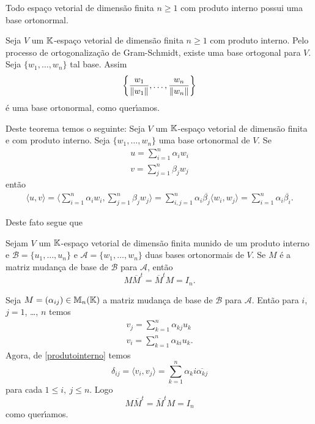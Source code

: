 \begin{teorema}
	Todo espa\c{c}o vetorial de dimens\~ao finita $n \ge 1$ com produto interno possui uma base ortonormal.
\end{teorema}
\begin{prova}
	Seja $V$ um $\mathbb{K}$-espa\c{c}o vetorial de dimens\~ao finita $n \ge 1$ com produto interno. Pelo processo de ortogonaliza\c{c}\~ao de Gram-Schmidt, existe uma base ortogonal para $V$. Seja $\{w_1, \dots, w_n\}$ tal base. Assim
	\[
		\left\{\dfrac{w_1}{\left\lVert w_1\right\rVert}, \dots, \dfrac{w_n}{\left\lVert w_n\right\rVert}\right\}
	\]
	\'e uma base ortonormal, como quer{\'\i}amos.
\end{prova}

Deste teorema temos o seguinte: Seja $V$ um $\mathbb{K}$-espa\c{c}o vetorial de dimens\~ao finita e com produto interno. Seja $\{w_1, \dots, w_n\}$ uma base ortonormal de $V$. Se
\begin{align*}
	u = \sum_{i = 1}^n \alpha_i w_i\\
	v = \sum_{j = 1}^n \beta_j w_j
\end{align*}
ent\~ao
\begin{align}\label{produtointerno}
	\langle u, v \rangle = \langle \sum_{i = 1}^n \alpha_i w_i, \sum_{j = 1}^n \beta_j w_j \rangle = \sum_{i, j = 1}^n \alpha_i \overline{\beta_j} \langle w_i, w_j \rangle = \sum_{i = 1}^n \alpha_i \overline{\beta_i}.
\end{align}

Deste fato segue que
\begin{corolario}
	Sejam $V$ um $\mathbb{K}$-espa\c{c}o vetorial de dimens\~ao finita munido de um produto interno e $\mathcal{B} = \{u_1, \dots, u_n\}$ e $\mathcal{A} = \{w_1, \dots, w_n\}$ duas bases ortonormais de $V$. Se $M$ \'e a matriz mudan\c{c}a de base de $\mathcal{B}$ para $\mathcal{A}$, ent\~ao
	\[
		M\overline{M}^t = \overline{M}^tM = I_n.
	\]
\end{corolario}
\begin{prova}
	Seja $M = (\alpha_{ij}) \in \mathbb{M}_n(\mathbb{K})$ a matriz mudan\c{c}a de base de $\mathcal{B}$ para $\mathcal{A}$. Ent\~ao para $i$, $j = 1$, \dots, $n$ temos
	\begin{align*}
		v_j = \sum_{k = 1}^n\alpha_{kj}u_k\\
		v_i = \sum_{k = 1}^n\alpha_{ki}u_k.
	\end{align*}
	Agora, de \eqref{produtointerno} temos
	\[
		\delta_{ij} = \langle v_i, v_j \rangle = \sum_{k = 1}^n\alpha_ki\overline{\alpha_{kj}}
	\]
	para cada $1 \le i,\ j \le n$. Logo
	\[
		M\overline{M}^t = \overline{M}^tM = I_n
	\]
	como quer{\'\i}amos.
\end{prova}
